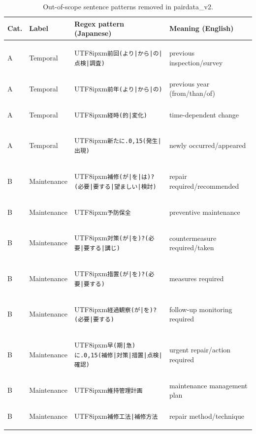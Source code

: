 ﻿\documentclass[onecolumn]{article}
\begin{document}
\begin{table}[h]
\centering
\caption{Out-of-scope sentence patterns removed in pairdata\_v2.}
\label{tab:noise_patterns}
\small
\begin{tabular}{ll p{5.5cm} p{5cm}}
\toprule
\textbf{Cat.} & \textbf{Label} & \textbf{Regex pattern (Japanese)} & \textbf{Meaning (English)} \\
\midrule
A & Temporal & \begin{CJK}{UTF8}{ipxm}\texttt{前回(より|から|の|点検|調査)}\end{CJK} & previous inspection/survey \\
A & Temporal & \begin{CJK}{UTF8}{ipxm}\texttt{前年(より|から|の)}\end{CJK} & previous year (from/than/of) \\
A & Temporal & \begin{CJK}{UTF8}{ipxm}\texttt{経時(的|変化)}\end{CJK} & time-dependent change \\
A & Temporal & \begin{CJK}{UTF8}{ipxm}\texttt{新たに.{0,15}(発生|出現)}\end{CJK} & newly occurred/appeared \\
\midrule
B & Maintenance & \begin{CJK}{UTF8}{ipxm}\texttt{補修(が|を|は)?(必要|要する|望ましい|検討)}\end{CJK} & repair required/recommended \\
B & Maintenance & \begin{CJK}{UTF8}{ipxm}\texttt{予防保全}\end{CJK} & preventive maintenance \\
B & Maintenance & \begin{CJK}{UTF8}{ipxm}\texttt{対策(が|を)?(必要|要する|講じ)}\end{CJK} & countermeasure required/taken \\
B & Maintenance & \begin{CJK}{UTF8}{ipxm}\texttt{措置(が|を)?(必要|要する)}\end{CJK} & measures required \\
B & Maintenance & \begin{CJK}{UTF8}{ipxm}\texttt{経過観察(が|を)?(必要|要する)}\end{CJK} & follow-up monitoring required \\
B & Maintenance & \begin{CJK}{UTF8}{ipxm}\texttt{早(期|急)に.{0,15}(補修|対策|措置|点検|確認)}\end{CJK} & urgent repair/action required \\
B & Maintenance & \begin{CJK}{UTF8}{ipxm}\texttt{維持管理計画}\end{CJK} & maintenance management plan \\
B & Maintenance & \begin{CJK}{UTF8}{ipxm}\texttt{補修工法|補修方法}\end{CJK} & repair method/technique \\
\bottomrule
\end{tabular}
\end{table}
\end{document}
